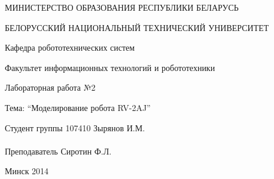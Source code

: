 \begin{titlepage} %

\thispagestyle{empty} %

\begin{center}
МИНИСТЕРСТВО ОБРАЗОВАНИЯ РЕСПУБЛИКИ БЕЛАРУСЬ

БЕЛОРУССКИЙ НАЦИОНАЛЬНЫЙ ТЕХНИЧЕСКИЙ УНИВЕРСИТЕТ

Кафедра робототехнических систем

Факультет информационных технологий и робототехники
\end{center}

\vfill

\begin{center}
Лабораторная работа №2

Тема: ``Моделирование робота RV-2AJ''
\end{center}

\vfill

\noindent
Студент группы 107410 \hfill Зырянов И.М.
\\
\\
\noindent
Преподаватель \hfill Сиротин Ф.Л.

\vfill

\centerline{Минск 2014}

\clearpage %

\end{titlepage}

\setcounter{page}{2}